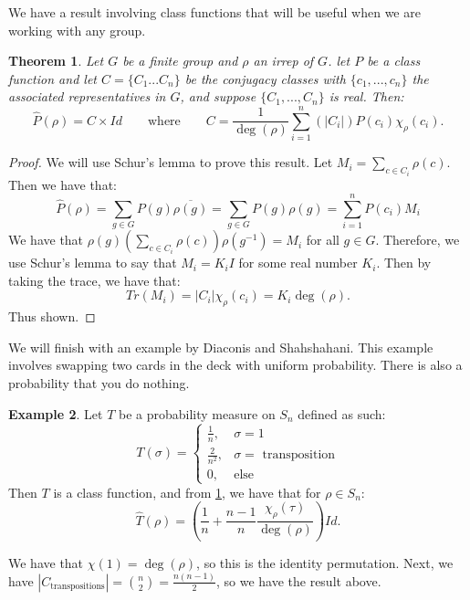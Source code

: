 \documentclass[]{article}
\newtheorem{theorem}{Theorem}
\theoremstyle{definition}
\newtheorem{example}[theorem]{Example}
\numberwithin{theorem}{section}
\numberwithin{equation}{section}
\begin{document}
We have a result involving class functions that will be useful when we are working with any group. 
\begin{theorem}\label{thm:class_fns}
	Let $G$ be a finite group and $\rho$ an irrep of $G$. let $P$ be a class function and let $C = \lbrace C_1... C_n \rbrace$ be the conjugacy classes with $\lbrace c_1, ..., c_n \rbrace$ the associated representatives in $G$, and suppose $\lbrace C_1, ..., C_n \rbrace$ is real. Then:
	\begin{equation}
		\widehat{P}(\rho)= C \times Id \qquad \text{where} \qquad C = \frac{1}{\deg(\rho)}  \sum_{i = 1}^n\left(|C_i|\right) P(c_i) \chi_\rho(c_i).
	\end{equation}
\end{theorem}
\begin{proof}
	We will use Schur's lemma to prove this result. 
	Let $M_i = \sum_{c \in C_i} \rho(c)$. Then we have that:
	\begin{equation}
			\widehat{P}(\rho) = \sum_{g \in G} P(g) \overline{\rho(g)} = \sum_{g \in G} P(g) \rho(g) =  \sum_{i = 1}^n P(c_i) M_i
	\end{equation}
	We have that $\rho(g) \left(\sum_{c \in C_i} \rho(c)\right) \rho(g^{-1}) = M_i$ for all $g \in G$. Therefore, we use Schur's lemma to say that $M_i = K_i I$ for some real number $K_i$. Then by taking the trace, we have that:
	\begin{equation}
		Tr(M_i) = |C_i| \chi_\rho(c_i) = K_i \deg(\rho).
	\end{equation}
	Thus shown. 
\end{proof}
We will finish with an example by Diaconis and Shahshahani. This example involves swapping two cards in the deck with uniform probability. There is also a probability that you do nothing. \cite{diaconisGeneratingRandomPermutation1981}
\begin{example}\label{ex:swap two cards}
	Let $T$ be a probability measure on $S_n$ defined as such:
	\begin{equation}
		T(\sigma) = \begin{cases}
			\frac{1}{n} , &\sigma = 1\\
			\frac{2}{n^2} , &\sigma = \text{ transposition}\\
			0 , &\text{else}
		\end{cases}
	\end{equation}
	Then $T$ is a class function, and from \cref{thm:class_fns}, we have that for $\rho \in S_n$:
	\begin{equation}
		\widehat{T}(\rho) = \left(\frac{1}{n} + \frac{n-1}{n} \frac{\chi_\rho(\tau)}{\deg(\rho)}\right) Id.
	\end{equation}
\end{example}
We have that $\chi(1) = \deg(\rho)$, so this is the identity permutation. Next, we have $|C_{\text{transpositions}}| = \binom{n}{2} = \frac{n(n-1)}{2}$, so we have the result above.
\end{document}
